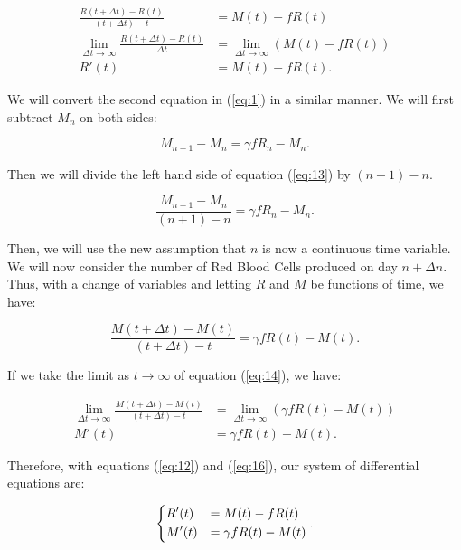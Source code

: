 \begin{align} 
    \frac{R(t+\Delta t) - R(t)}{(t+\Delta t)-t} &= M(t) - fR(t) \nonumber\\
    \lim_{\Delta t\to\infty} \frac{R(t+\Delta t) - R(t)}{\Delta t} &= \lim_{\Delta t\to\infty} (M(t) - fR(t)) \nonumber\\
    R'(t) &= M(t) - fR(t). \label{eq:12}
\end{align}

We will convert the second equation in (\ref{eq:1}) in a similar manner. We will first subtract $M_n$ on both sides:

\begin{equation}
    M_{n+1} - M_n = \gamma fR_n - M_n.
    \label{eq:13}
\end{equation}

Then we will divide the left hand side of equation (\ref{eq:13}) by $(n+1)-n$.

\begin{equation}
    \frac{M_{n+1} - M_n}{(n+1)-n} = \gamma fR_n - M_n.
    \label{eq:13}
\end{equation}

Then, we will use the new assumption that $n$ is now a continuous time variable. We will now consider the number of Red Blood Cells produced on day $n+\Delta n$. Thus, with a change of variables and letting $R$ and $M$ be functions of time, we have:

\begin{equation}
    \frac{M(t+\Delta t) - M(t)}{(t+\Delta t)-t} = \gamma fR(t) - M(t).
    \label{eq:14}
\end{equation}

If we take the limit as $t\to\infty$ of equation (\ref{eq:14}), we have:

\begin{align} 
    \lim_{\Delta t \to\infty}\frac{M(t+\Delta t) - M(t)}{(t+\Delta t)-t} &= \lim_{\Delta t \to\infty} (\gamma fR(t) - M(t)) \nonumber\\
    M'(t) &= \gamma fR(t) - M(t).\label{eq:16}
\end{align}

Therefore, with equations (\ref{eq:12}) and (\ref{eq:16}), our system of differential equations are:

\begin{equation}
    \begin{dcases}
        R'(t) &= M(t) - fR(t)\\
        M'(t) &= \gamma fR(t) - M(t)
    \end{dcases}.
    \label{eq:17}
\end{equation}

